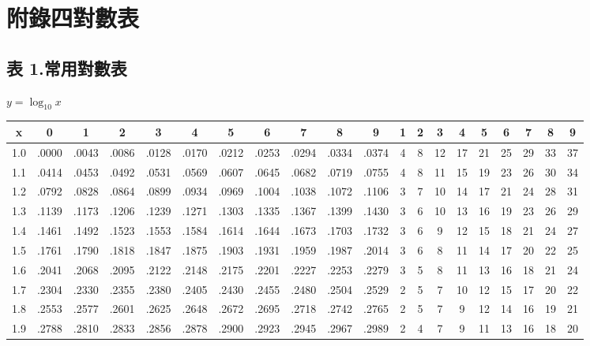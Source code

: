 \section*{附錄四\quad 對數表}
\label{sec:b3_a4}

\subsection*{表 1.\quad 常用對數表}
\begin{center} $y = \log_{10} x$ \end{center}
{\centering\fontsize{7.5pt}{8.8pt}\selectfont\setlength{\tabcolsep}{1.5pt}\renewcommand{\arraystretch}{0.96}
\begin{tabular}{|c|cccccccccc|ccccccccc|}
\hline
x & 0 & 1 & 2 & 3 & 4 & 5 & 6 & 7 & 8 & 9 & 1 & 2 & 3 & 4 & 5 & 6 & 7 & 8 & 9 \\ \hline
1.0 & .0000 & .0043 & .0086 & .0128 & .0170 & .0212 & .0253 & .0294 & .0334 & .0374 & 4 & 8 & 12 & 17 & 21 & 25 & 29 & 33 & 37 \\
1.1 & .0414 & .0453 & .0492 & .0531 & .0569 & .0607 & .0645 & .0682 & .0719 & .0755 & 4 & 8 & 11 & 15 & 19 & 23 & 26 & 30 & 34 \\
1.2 & .0792 & .0828 & .0864 & .0899 & .0934 & .0969 & .1004 & .1038 & .1072 & .1106 & 3 & 7 & 10 & 14 & 17 & 21 & 24 & 28 & 31 \\
1.3 & .1139 & .1173 & .1206 & .1239 & .1271 & .1303 & .1335 & .1367 & .1399 & .1430 & 3 & 6 & 10 & 13 & 16 & 19 & 23 & 26 & 29 \\
1.4 & .1461 & .1492 & .1523 & .1553 & .1584 & .1614 & .1644 & .1673 & .1703 & .1732 & 3 & 6 & 9 & 12 & 15 & 18 & 21 & 24 & 27 \\
1.5 & .1761 & .1790 & .1818 & .1847 & .1875 & .1903 & .1931 & .1959 & .1987 & .2014 & 3 & 6 & 8 & 11 & 14 & 17 & 20 & 22 & 25 \\
1.6 & .2041 & .2068 & .2095 & .2122 & .2148 & .2175 & .2201 & .2227 & .2253 & .2279 & 3 & 5 & 8 & 11 & 13 & 16 & 18 & 21 & 24 \\
1.7 & .2304 & .2330 & .2355 & .2380 & .2405 & .2430 & .2455 & .2480 & .2504 & .2529 & 2 & 5 & 7 & 10 & 12 & 15 & 17 & 20 & 22 \\
1.8 & .2553 & .2577 & .2601 & .2625 & .2648 & .2672 & .2695 & .2718 & .2742 & .2765 & 2 & 5 & 7 & 9 & 12 & 14 & 16 & 19 & 21 \\
1.9 & .2788 & .2810 & .2833 & .2856 & .2878 & .2900 & .2923 & .2945 & .2967 & .2989 & 2 & 4 & 7 & 9 & 11 & 13 & 16 & 18 & 20 \\

\end{tabular}}
